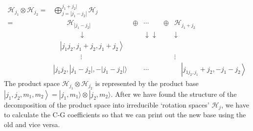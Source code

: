 \begin{equation}
\begin{array}{rlcccc} 
\mathcal{H}_{j_{1}} \otimes \mathcal{H}_{j_{2}}
=& \bigoplus\limits_{j=\left|j_{1}-j_{2}\right|}^{j_{1}+j_{2} |} \mathcal{H}_{j} \\
=& \qquad\mathcal{H}_{\left|j_{1}-j_{2}\right|} & \oplus& \cdots  &\oplus &\mathcal{H}_{j_{1}+j_{2}} \\
&\qquad\qquad\downarrow&&\downarrow\downarrow&&\downarrow\\
& \quad\left|j_{1} j_{2}, j_{1}+j_{2}, j_{1}+j_{2}\right\rangle \\ 
&\qquad\qquad\vdots & && & \vdots \\
&\left|j_{1} j_{2},\right| j_{1}-j_{2}|,-| j_{1}-j_{2}|\rangle & &\cdots&&\quad\left|j_{1 j_{2}, j_{1}}+j_{2},-j_{1}-j_{2}\right\rangle \end{array}
\end{equation}
The product space $\mathcal{H}_{j_{1}} \otimes \mathcal{H}_{j_{2}}$ is represented by the product base $\left|j_{1}, j_{2}, m_{1}, m_{2}\right\rangle=|j_{1}, m_{1}\rangle\otimes|j_2,m_2\rangle$. After we have found the structure of the decomposition of the product space into irreducible `rotation spaces’ $\mathcal{H}_j$, we have to calculate the C-G coefficients so that we can print out the new base using the old and vice versa.

